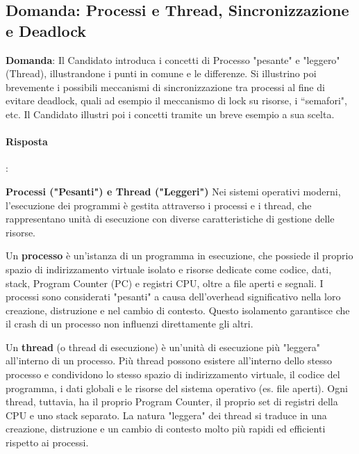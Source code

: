 
\subsection*{Domanda: Processi e Thread, Sincronizzazione e Deadlock}

\textbf{Domanda}: Il Candidato introduca i concetti di Processo "pesante" e "leggero" (Thread), illustrandone i punti in comune e le differenze. Si illustrino poi brevemente i possibili meccanismi di sincronizzazione tra processi al fine di evitare deadlock, quali ad esempio il meccanismo di lock su risorse, i “semafori", etc. Il Candidato illustri poi i concetti tramite un breve esempio a sua scelta.

\paragraph{Risposta}:

\textbf{Processi ("Pesanti") e Thread ("Leggeri")}
Nei sistemi operativi moderni, l'esecuzione dei programmi è gestita attraverso i processi e i thread, che rappresentano unità di esecuzione con diverse caratteristiche di gestione delle risorse.

Un \textbf{processo} è un'istanza di un programma in esecuzione, che possiede il proprio spazio di indirizzamento virtuale isolato e risorse dedicate come codice, dati, stack, Program Counter (PC) e registri CPU, oltre a file aperti e segnali. I processi sono considerati "pesanti" a causa dell'overhead significativo nella loro creazione, distruzione e nel cambio di contesto. Questo isolamento garantisce che il crash di un processo non influenzi direttamente gli altri.

Un \textbf{thread} (o thread di esecuzione) è un'unità di esecuzione più "leggera" all'interno di un processo. Più thread possono esistere all'interno dello stesso processo e condividono lo stesso spazio di indirizzamento virtuale, il codice del programma, i dati globali e le risorse del sistema operativo (es. file aperti). Ogni thread, tuttavia, ha il proprio Program Counter, il proprio set di registri della CPU e uno stack separato. La natura "leggera" dei thread si traduce in una creazione, distruzione e un cambio di contesto molto più rapidi ed efficienti rispetto ai processi.


